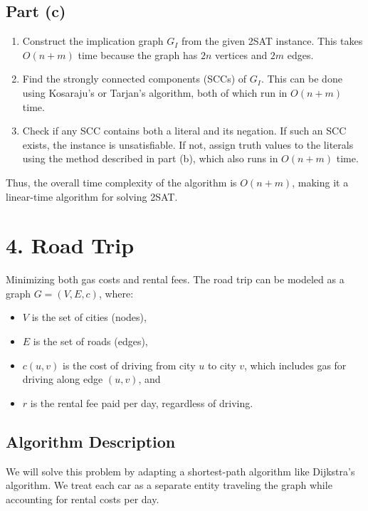 \documentclass[11pt]{article}
\begin{document}
\subsection*{Part (c)}


\begin{enumerate}
    \item Construct the implication graph \( G_I \) from the given 2SAT instance. This takes \( O(n + m) \) time because the graph has \( 2n \) vertices and \( 2m \) edges.
    \item Find the strongly connected components (SCCs) of \( G_I \). This can be done using Kosaraju's or Tarjan's algorithm, both of which run in \( O(n + m) \) time.
    \item Check if any SCC contains both a literal and its negation. If such an SCC exists, the instance is unsatisfiable. If not, assign truth values to the literals using the method described in part (b), which also runs in \( O(n + m) \) time.
\end{enumerate}

Thus, the overall time complexity of the algorithm is \( O(n + m) \), making it a linear-time algorithm for solving 2SAT.


\newpage

\section*{4. Road Trip}

Minimizing both gas costs and rental fees. The road trip can be modeled as a graph \( G = (V, E, c) \), where:

\begin{itemize}
    \item \( V \) is the set of cities (nodes),
    \item \( E \) is the set of roads (edges),
    \item \( c(u, v) \) is the cost of driving from city \( u \) to city \( v \), which includes gas for driving along edge \( (u, v) \), and
    \item \( r \) is the rental fee paid per day, regardless of driving.
\end{itemize}


\subsection*{Algorithm Description}
We will solve this problem by adapting a shortest-path algorithm like Dijkstra's algorithm. We treat each car as a separate entity traveling the graph while accounting for rental costs per day.
\end{document}
